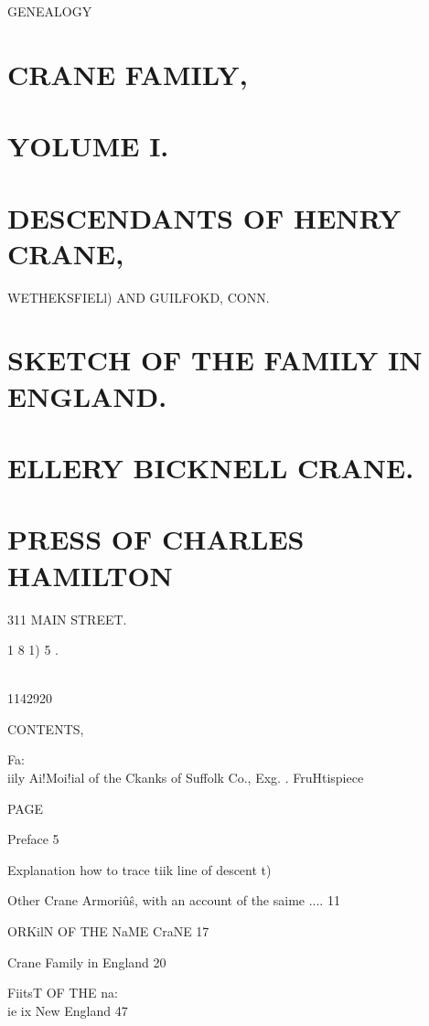 GENEALOGY 



\chapter{CRANE FAMILY,}


\chapter{YOLUME I.}


\chapter{DESCENDANTS OF HENRY CRANE,}


WETHEKSFIELl) AND GUILFOKD, CONN. 



\chapter{SKETCH OF THE FAMILY IN ENGLAND.}


\chapter{ELLERY BICKNELL CRANE.}


\chapter{PRESS OF CHARLES HAMILTON}311 MAIN STREET. 

1 8 1) 5 . 



\^\\ 



1142920 

CONTENTS, 



Fa:\\iily Ai!Moi!ial of the Ckanks of Suffolk Co., Exg. . FruHtispiece 

PAGE 

Preface 5 

Explanation how to trace tiik line of descent t) 

Other Crane Armori\^u\^s, with an account of the saime .... 11 

ORKilN OF THE NaME CraNE  17 

Crane Family in England 20 

FiitsT OF THE na:\\ie ix New England 47 

